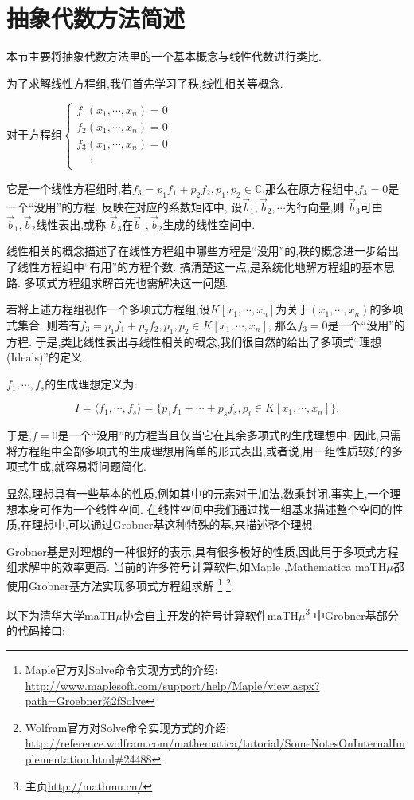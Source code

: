 \section{抽象代数方法简述}
	本节主要将抽象代数方法里的一个基本概念与线性代数进行类比.

	为了求解线性方程组,我们首先学习了秩,线性相关等概念.

	对于方程组$ \begin{cases}
		f_1(x_1,\cdots,x_n)=0\\
		f_2(x_1,\cdots,x_n)=0\\
		f_3(x_1,\cdots,x_n)=0\\
		\hspace{15pt}\vdots\\
	\end{cases}$
	
	它是一个线性方程组时,若$ f_3=p_1f_1+p_2f_2,p_1,p_2\in \mathbb{C}$,那么在原方程组中,$ f_3=0$是一个``没用''的方程.
	反映在对应的系数矩阵中,
	设$ \overrightarrow b_1,\overrightarrow b_2,\cdots $为行向量,则
	$ \overrightarrow b_3$可由$ \overrightarrow b_1,\overrightarrow b_2$线性表出,或称
	$ \overrightarrow b_3$在$ \overrightarrow b_1,\overrightarrow b_2$生成的线性空间中.

	线性相关的概念描述了在线性方程组中哪些方程是``没用''的,秩的概念进一步给出了线性方程组中``有用''的方程个数.
	搞清楚这一点,是系统化地解方程组的基本思路.
	多项式方程组求解首先也需解决这一问题.

	若将上述方程组视作一个多项式方程组,设$ K[x_1,\cdots, x_n]$为关于$ (x_1,\cdots , x_n)$的多项式集合.
	则若有$ f_3 = p_1f_1 + p_2f_2,p_1,p_2\in K[x_1,\cdots, x_n]$,
	那么$ f_3=0$是一个``没用''的方程.  
	于是,类比线性表出与线性相关的概念,我们很自然的给出了多项式``理想(Ideals)''的定义.

	$ f_1,\cdots,f_s $的生成理想定义为: 

\[ I=\langle f_1,\cdots,f_s \rangle = \{p_1f_1+\cdots+p_sf_s,p_i\in K[x_1,\cdots,x_n]\}.\]

	于是,$ f=0$是一个``没用''的方程当且仅当它在其余多项式的生成理想中.
	因此,只需将方程组中全部多项式的生成理想用简单的形式表出,或者说,用一组性质较好的多项式生成,就容易将问题简化.

	显然,理想具有一些基本的性质,例如其中的元素对于加法,数乘封闭.事实上,一个理想本身可作为一个线性空间.
	在线性空间中我们通过找一组基来描述整个空间的性质,在理想中,可以通过Grobner基这种特殊的基,来描述整个理想.

	Grobner基是对理想的一种很好的表示,具有很多极好的性质,因此用于多项式方程组求解中的效率更高.
	当前的许多符号计算软件,如Maple
	,Mathematica
	maTH$ \mu$都使用Grobner基方法实现多项式方程组求解
	\footnote{Maple官方对Solve命令实现方式的介绍:
		\url{http://www.maplesoft.com/support/help/Maple/view.aspx?path=Groebner\%2fSolve}}
	\footnote{Wolfram官方对Solve命令实现方式的介绍:
		\url{http://reference.wolfram.com/mathematica/tutorial/SomeNotesOnInternalImplementation.html\#24488}}.

	以下为清华大学maTH$ \mu$协会自主开发的符号计算软件maTH$ \mu$\footnote{主页\url{http://mathmu.cn/}} 中Grobner基部分的代码接口:

